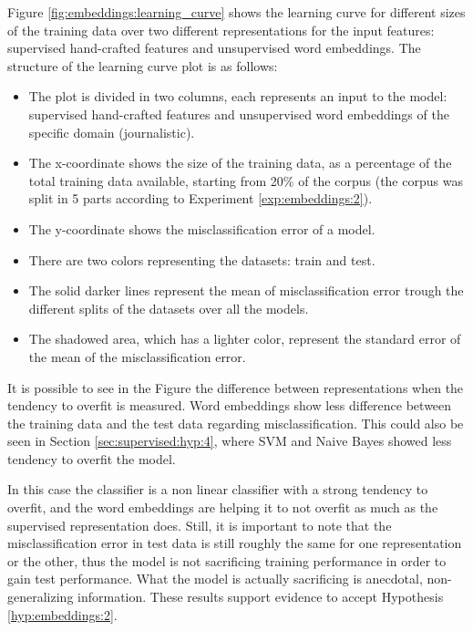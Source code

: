 Figure \ref{fig:embeddings:learning_curve} shows the learning curve for
different sizes of the training data over two different representations for the
input features: supervised hand-crafted features and unsupervised word
embeddings. The structure of the learning curve plot is as follows:

\begin{itemize}
  \item The plot is divided in two columns, each represents an input to the
    model: supervised hand-crafted features and unsupervised word embeddings of
    the specific domain (journalistic).
  \item The x-coordinate shows the size of the training data, as a percentage
    of the total training data available, starting from 20\% of the corpus (the
    corpus was split in 5 parts according to Experiment
    \ref{exp:embeddings:2}).
  \item The y-coordinate shows the misclassification error of a model.
  \item There are two colors representing the datasets: train and test.
  \item The solid darker lines represent the mean of misclassification error
    trough the different splits of the datasets over all the models.
  \item The shadowed area, which has a lighter color, represent the standard
    error of the mean of the misclassification error.
\end{itemize}

It is possible to see in the Figure the difference between representations when
the tendency to overfit is measured. Word embeddings show less difference
between the training data and the test data regarding misclassification. This
could also be seen in Section \ref{sec:supervised:hyp:4}, where SVM and Naive
Bayes showed less tendency to overfit the model.

In this case the classifier is a non linear classifier with a strong tendency
to overfit, and the word embeddings are helping it to not overfit as much as
the supervised representation does. Still, it is important to note that the
misclassification error in test data is still roughly the same for one
representation or the other, thus the model is not sacrificing training
performance in order to gain test performance. What the model is actually
sacrificing is anecdotal, non-generalizing information. These results support
evidence to accept Hypothesis \ref{hyp:embeddings:2}. 

